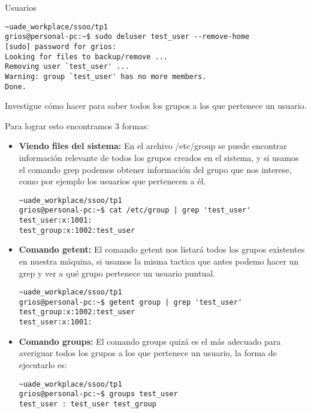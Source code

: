 \begin{section}{Usuarios}
\begin{lstlisting}[style=Ubuntu]
~uade_workplace/ssoo/tp1
grios@personal-pc:~$ sudo deluser test_user --remove-home  
[sudo] password for grios: 
Looking for files to backup/remove ...
Removing user `test_user' ...
Warning: group `test_user' has no more members.
Done.

\end{lstlisting}


\begin{quoting}
Investigue cómo hacer para saber todos los grupos a los que pertenece un usuario.
\end{quoting}

Para lograr esto encontramos 3 formas:

\begin{itemize}

\item \textbf{Viendo files del sistema:}
En el archivo /etc/group se puede encontrar información relevante de todos los grupos creados en el sistema, y si usamos el comando grep podemos obtener información del grupo que nos interese, como por ejemplo los usuarios que pertenecen a él.

\begin{lstlisting}[style=Ubuntu]
~uade_workplace/ssoo/tp1
grios@personal-pc:~$ cat /etc/group | grep 'test_user'
test_user:x:1001:
test_group:x:1002:test_user
\end{lstlisting}

\item \textbf{Comando getent:}
El comando getent nos listará todos los grupos existentes en nuestra máquina, si usamos la misma tactica que antes podemo hacer un grep y ver a qué grupo pertenece un usuario puntual.

\begin{lstlisting}[style=Ubuntu]
~uade_workplace/ssoo/tp1
grios@personal-pc:~$ getent group | grep 'test_user'
test_group:x:1002:test_user
test_user:x:1001:
\end{lstlisting}

\item \textbf{Comando groups:}
El comando groups quizá es el más adecuado para averiguar todos los grupos a los que pertenece un usuario, la forma de ejecutarlo es:

\begin{lstlisting}[style=Ubuntu]
~uade_workplace/ssoo/tp1
grios@personal-pc:~$ groups test_user
test_user : test_user test_group
\end{lstlisting}

\end{itemize}
\end{section}